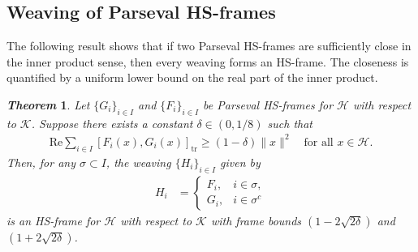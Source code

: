 \documentclass[reqno]{amsart}
\theoremstyle{plain}
\newtheorem{thm}{\it Theorem}[section]
\theoremstyle{remark}
\numberwithin{equation}{section}
\begin{document}
\subsection{Weaving of Parseval HS-frames}
The following result shows that if two Parseval HS-frames are sufficiently close in the inner product sense, then every weaving forms an HS-frame.
The closeness is quantified by a uniform lower bound on the real part of the inner product.
\begin{thm}\label{th5}
Let $\{G_i\}_{i \in I}$ and $\{F_i\}_{i \in I}$ be Parseval HS-frames for $\mathcal{H}$ with respect to $\mathcal{K}$. Suppose there exists a constant $\delta \in (0, 1/8)$  such that
\begin{align}\label{eqa1}
\text{Re} \sum_{i \in I} [ F_i(x), G_i(x) ]_{\text{tr}} \geq (1 - \delta) \|x\|^2 \quad \text{for all } x \in \mathcal{H}.
\end{align}
Then, for any $\sigma \subset I$, the weaving $\{H_i\}_{i \in I}$ given by
\begin{align*}
    H_i &= \begin{cases}
    F_i, & i \in \sigma,\\
    G_i, & i \in \sigma^c
    \end{cases}
\end{align*}
is an HS-frame for $\mathcal{H}$ with respect to $\mathcal{K}$ with frame bounds $(1 - 2\sqrt{2\delta})$ and $(1 + 2\sqrt{2\delta})$.
\end{thm}
\end{document}
